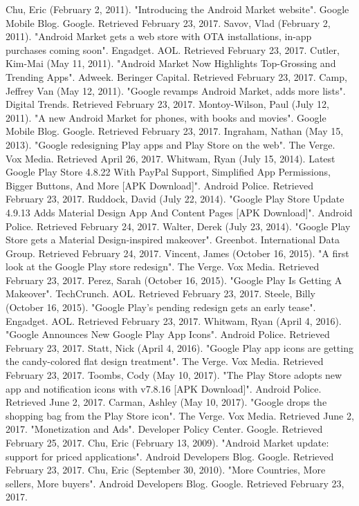 \documentclass{article}                    %
\begin{document}
Chu, Eric (February 2, 2011). "Introducing the Android Market website". Google Mobile Blog. Google. Retrieved February 23, 2017.
Savov, Vlad (February 2, 2011). "Android Market gets a web store with OTA installations, in-app purchases coming soon". Engadget. AOL. Retrieved February 23, 2017.
Cutler, Kim-Mai (May 11, 2011). "Android Market Now Highlights Top-Grossing and Trending Apps". Adweek. Beringer Capital. Retrieved February 23, 2017.
Camp, Jeffrey Van (May 12, 2011). "Google revamps Android Market, adds more lists". Digital Trends. Retrieved February 23, 2017.
Montoy-Wilson, Paul (July 12, 2011). "A new Android Market for phones, with books and movies". Google Mobile Blog. Google. Retrieved February 23, 2017.
Ingraham, Nathan (May 15, 2013). "Google redesigning Play apps and Play Store on the web". The Verge. Vox Media. Retrieved April 26, 2017.
Whitwam, Ryan (July 15, 2014).  Latest Google Play Store 4.8.22 With PayPal Support, Simplified App Permissions, Bigger Buttons, And More [APK Download]". Android Police. Retrieved February 23, 2017.
Ruddock, David (July 22, 2014). "Google Play Store Update 4.9.13 Adds Material Design App And Content Pages [APK Download]". Android Police. Retrieved February 24, 2017.
Walter, Derek (July 23, 2014). "Google Play Store gets a Material Design-inspired makeover". Greenbot. International Data Group. Retrieved February 24, 2017.
Vincent, James (October 16, 2015). "A first look at the Google Play store redesign". The Verge. Vox Media. Retrieved February 23, 2017.
Perez, Sarah (October 16, 2015). "Google Play Is Getting A Makeover". TechCrunch. AOL. Retrieved February 23, 2017.
Steele, Billy (October 16, 2015). "Google Play's pending redesign gets an early tease". Engadget. AOL. Retrieved February 23, 2017.
Whitwam, Ryan (April 4, 2016). "Google Announces New Google Play App Icons". Android Police. Retrieved February 23, 2017.
Statt, Nick (April 4, 2016). "Google Play app icons are getting the candy-colored flat design treatment". The Verge. Vox Media. Retrieved February 23, 2017.
Toombs, Cody (May 10, 2017). "The Play Store adopts new app and notification icons with v7.8.16 [APK Download]". Android Police. Retrieved June 2, 2017.
Carman, Ashley (May 10, 2017). "Google drops the shopping bag from the Play Store icon". The Verge. Vox Media. Retrieved June 2, 2017.
"Monetization and Ads". Developer Policy Center. Google. Retrieved February 25, 2017.
Chu, Eric (February 13, 2009). "Android Market update: support for priced applications". Android Developers Blog. Google. Retrieved February 23, 2017.
Chu, Eric (September 30, 2010). "More Countries, More sellers, More buyers". Android Developers Blog. Google. Retrieved February 23, 2017.
\end{document}
